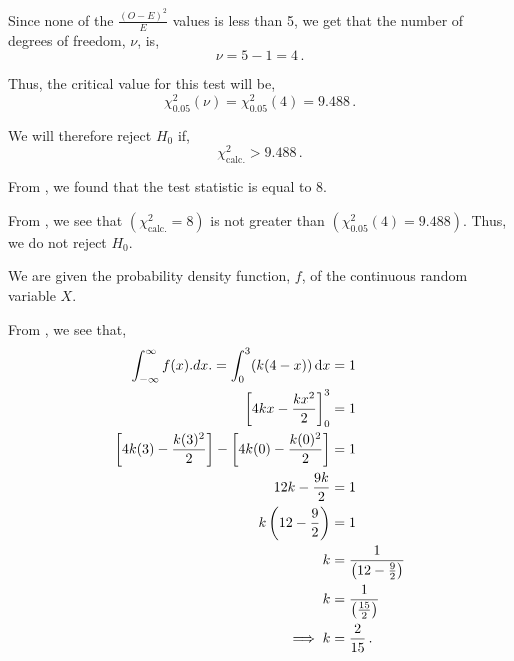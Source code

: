 \begin{subquestions}
\begin{subsubquestions}
Since none of the $\frac{(O-E)^2}{E}$ values is less than 5, we get that the number of degrees of freedom, $\nu$, is,
\begin{equation}
	\nu = 5-1=4 \,.
\end{equation}

Thus, the critical value for this test will be,
\begin{equation}
	\chi^{2}_{0.05} (\nu) = \chi^{2}_{0.05} (4) = 9.488 \,.
\end{equation}

We will therefore reject $H_0$ if,
\begin{equation}
	\chi^{2}_{\text{calc.}} > 9.488 \,. \label{2016:q4:CritReg}
\end{equation}


\subsubquestion

From , we found that the test statistic is equal to 8.


\subsubquestion

From , we see that $\left( \chi^{2}_{\text{calc.}}=8 \right)$ is not greater than $\left(\chi^{2}_{0.05} (4) = 9.488 \right)$. Thus, we do not reject $H_0$.

\end{subsubquestions}
	
	
\subquestion

We are given the probability density function, $f$, of the continuous random variable $X$.

\begin{subsubquestions}
	
\subsubquestion

From , we see that,
\begin{align}
	\int_{-\infty}^{\infty} f(x).dx. = \int_{0}^{3} (k(4-x))\, \mathrm{d}x & = 1 \nonumber \\
	\left[ 4kx- \frac{kx^2}{2} \right]^3_0 & = 1 \nonumber \\
	\left[ 4k(3)- \frac{k(3)^2}{2} \right] - \left[ 4k(0)- \frac{k(0)^2}{2} \right] & = 1 \nonumber \\
	12k - \frac{9k}{2} & = 1 \nonumber \\
	k \left(12 - \frac{9}{2}\right) & = 1 \nonumber \\
	k & = \frac{1}{\left(12 - \frac{9}{2}\right)} \nonumber \\
	k & = \frac{1}{\left(\frac{15}{2}\right)} \nonumber \\
	\implies k & = \frac{2}{15} \,.
\end{align}
	

\end{subsubquestions}
\end{subquestions}
